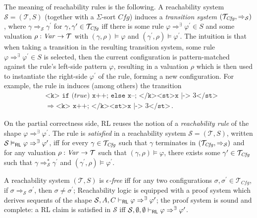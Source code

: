 The meaning of reachability rules is the following.
A reachability system $\mathcal{S} = (\mathcal{T}, S)$ (together with a $\Sigma$-sort $\mathit{Cfg}$)
induces
a \emph{transition system}
$(\mathcal{T}_{\mathit{Cfg}} , \Rightarrow_{\mathcal{S}})$,
where $\gamma \Rightarrow_{\mathcal{S}} \gamma^\prime$
for $\gamma, \gamma^\prime \in \mathcal{T}_{\mathit{Cfg}}$
iff there is some rule $\varphi \Rightarrow^\exists \varphi^\prime \in S$
and some valuation $\rho : \mathit{Var} \to \mathcal{T}$ with $(\gamma, \rho) \vDash \varphi$
and $(\gamma^\prime , \rho) \vDash \varphi^\prime$.
The intuition is that when taking a transition in the resulting transition system,
some rule $\varphi \Rightarrow^\exists \varphi^\prime \in S$ is selected,
then the current configuration is pattern-matched against the rule's left-side pattern $\varphi$,
resulting in a valuation $\rho$ which is then used to instantiate the right-side $\varphi^\prime$ of the rule,
forming a new configuration.
For example, the rule in  induces (among others) the transition
\begin{equation}\label{eqn:ruleIfTrue}
    \begin{aligned}
    & \texttt{<k> if (} \mathit{true} \texttt{) x++; else x--; </k><st>x} \texttt{ |-> } 3\texttt{</st>} \\
    & \Rightarrow \texttt{<k> x++; </k><st>x} \texttt{ |-> } 3\texttt{</st>} \, .
    \end{aligned}
\end{equation}

On the partial correctness side, RL reuses the notion of a \emph{reachability rule}
of the shape $\varphi \Rightarrow^\exists \varphi^\prime$.
The rule is \emph{satisfied}
in a reachability system $\mathcal{S} = (\mathcal{T}, S)$,
written $\mathcal{S} \vDash_{\mathsf{RL}} \varphi \Rightarrow^\exists \varphi^\prime$,
iff for every $\gamma \in \mathcal{T}_{\mathit{Cfg}}$
such that $\gamma$ terminates in $(\mathcal{T}_{\mathit{Cfg}}, \Rightarrow_{\mathcal{S}})$
and for any valuation $\rho : \mathit{Var} \to \mathcal{T}$
such that $(\gamma, \rho) \vDash \varphi$,
there exists some $\gamma^\prime \in \mathcal{T}_{\mathit{Cfg}}$
such that
$\gamma \Rightarrow^{*}_{\mathcal{S}} \gamma^\prime$
and $(\gamma^\prime, \rho) \vDash \varphi^\prime$.



A reachability system $(\mathcal{T}, S)$ is \emph{$\epsilon$-free}
iff for any two configurations $\sigma, \sigma^\prime \in \mathcal{T}_{\mathit{Cfg}}$, if
$\sigma \Rightarrow_{\mathcal{S}} \sigma^\prime$, then $\sigma \not = \sigma^\prime$;
Reachability logic is equipped with a proof system which derives sequents of the shape
$\mathcal{S}, A, C \vdash_{\mathsf{RL}} \varphi \Rightarrow^\exists \varphi^\prime$;
the proof system is sound and complete: a RL claim is satisfied in $\mathcal{S}$
iff $\mathcal{S}, \emptyset, \emptyset \vdash_{\mathsf{RL}} \varphi \Rightarrow^\exists \varphi^\prime$.


